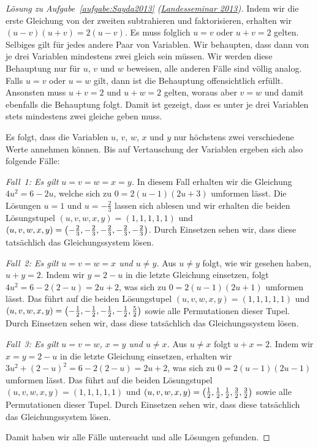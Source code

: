 \begin{proof}[Lösung zu Aufgabe~\ref{aufgabe:Sayda2013} \textmd{(\href{http://www.landesseminar-sachsen.de/klausuren/LS23-09.pdf}{Landesseminar 2013})}]
	Indem wir die erste Gleichung von der zweiten subtrahieren und faktorisieren, erhalten wir $(u-v)(u+v)=2(u-v)$. Es muss folglich $u=v$ oder $u+v=2$ gelten. Selbiges gilt für jedes andere Paar von Variablen. Wir behaupten, dass dann von je drei Variablen mindestens zwei gleich sein müssen. Wir werden diese Behauptung nur für $u$, $v$ und $w$ beweisen, alle anderen Fälle sind völlig analog. Falls $u=v$ oder $u=w$ gilt, dann ist die Behauptung offensichtlich erfüllt. Ansonsten muss $u+v=2$ und $u+w=2$ gelten, woraus aber $v=w$ und damit ebenfalls die Behauptung folgt. Damit ist gezeigt, dass es unter je drei Variablen stets mindestens zwei gleiche geben muss.
	
	Es folgt, dass die Variablen $u$, $v$, $w$, $x$ und $y$ nur höchstens zwei verschiedene Werte annehmen können. Bis auf Vertauschung der Variablen ergeben sich also folgende Fälle:
	
	\emph{Fall~1: Es gilt $u=v=w=x=y$.} In diesem Fall erhalten wir die Gleichung $4u^2=6-2u$, welche sich zu $0=2(u-1)(2u+3)$ umformen lässt. Die Lösungen $u=1$ und $u=-\frac23$ lassen sich ablesen und wir erhalten die beiden Lösungstupel $(u,v,w,x,y)=(1,1,1,1,1)$ und $(u,v,w,x,y)=\parens[\big]{-\frac23,-\frac23,-\frac23,-\frac23,-\frac23}$. Durch Einsetzen sehen wir, dass diese tatsächlich das Gleichungssystem lösen.
	
	\emph{Fall~2: Es gilt $u=v=w=x$ und $u\neq y$.} Aus $u\neq y$ folgt, wie wir gesehen haben, $u+y=2$. Indem wir $y=2-u$ in die letzte Gleichung einsetzen, folgt $4u^2=6-2(2-u)=2u+2$, was sich zu $0=2(u-1)(2u+1)$ umformen lässt. Das führt auf die beiden Lösungstupel $(u,v,w,x,y)=(1,1,1,1,1)$ und $(u,v,w,x,y)=\parens[\big]{-\frac12,-\frac12,-\frac12,-\frac12,\frac52}$ sowie alle Permutationen dieser Tupel. Durch Einsetzen sehen wir, dass diese tatsächlich das Gleichungssystem lösen.
	
	\emph{Fall~3: Es gilt $u=v=w$, $x=y$ und $u\neq x$.} Aus $u\neq x$ folgt $u+x=2$. Indem wir $x=y=2-u$ in die letzte Gleichung einsetzen, erhalten wir $3u^2+(2-u)^2=6-2(2-u)=2u+2$, was sich zu $0=2(u-1)(2u-1)$ umformen lässt. Das führt auf die beiden Lösungstupel $(u,v,w,x,y)=(1,1,1,1,1)$ und $(u,v,w,x,y)=\parens[\big]{\frac12,\frac12,\frac12,\frac32,\frac32}$ sowie alle Permutationen dieser Tupel. Durch Einsetzen sehen wir, dass diese tatsächlich das Gleichungssystem lösen.
	
	Damit haben wir alle Fälle untersucht und alle Lösungen gefunden.
\end{proof}
